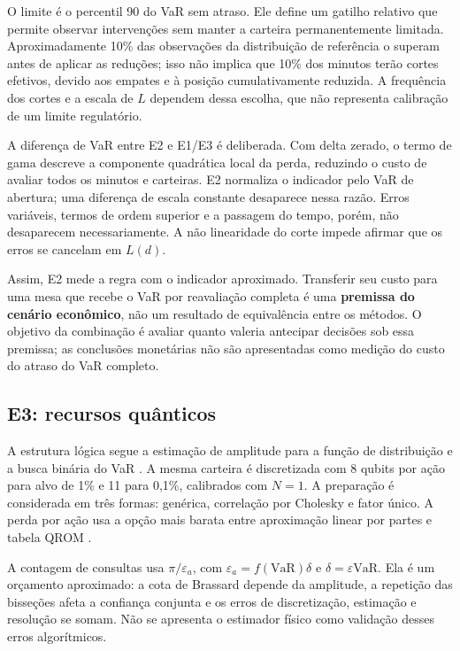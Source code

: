 \documentclass[conference,a4paper]{IEEEtran}
\begin{document}
O limite é o percentil 90 do VaR sem atraso. Ele define um gatilho relativo que permite observar intervenções sem manter a carteira permanentemente limitada. Aproximadamente 10\% das observações da distribuição de referência o superam antes de aplicar as reduções; isso não implica que 10\% dos minutos terão cortes efetivos, devido aos empates e à posição cumulativamente reduzida. A frequência dos cortes e a escala de \(L\) dependem dessa escolha, que não representa calibração de um limite regulatório.

A diferença de VaR entre E2 e E1/E3 é deliberada. Com delta zerado, o termo de gama descreve a componente quadrática local da perda, reduzindo o custo de avaliar todos os minutos e carteiras. E2 normaliza o indicador pelo VaR de abertura; uma diferença de escala constante desaparece nessa razão. Erros variáveis, termos de ordem superior e a passagem do tempo, porém, não desaparecem necessariamente. A não linearidade do corte impede afirmar que os erros se cancelam em \(L(d)\).

Assim, E2 mede a regra com o indicador aproximado. Transferir seu custo para uma mesa que recebe o VaR por reavaliação completa é uma \textbf{premissa do cenário econômico}, não um resultado de equivalência entre os métodos. O objetivo da combinação é avaliar quanto valeria antecipar decisões sob essa premissa; as conclusões monetárias não são apresentadas como medição do custo do atraso do VaR completo.

\subsection{E3: recursos quânticos}\label{e3-recursos-quuxe2nticos}

A estrutura lógica segue a estimação de amplitude para a função de distribuição e a busca binária do VaR \cite{woerner2019risk}. A mesma carteira é discretizada com 8 qubits por ação para alvo de 1\% e 11 para 0,1\%, calibrados com \(N=1\). A preparação é considerada em três formas: genérica, correlação por Cholesky e fator único. A perda por ação usa a opção mais barata entre aproximação linear por partes e tabela QROM \cite{babbush2018qrom}.

A contagem de consultas usa \(\pi/\varepsilon_a\), com \(\varepsilon_a=f(\mathrm{VaR})\delta\) e \(\delta=\varepsilon\mathrm{VaR}\). Ela é um orçamento aproximado: a cota de Brassard depende da amplitude, a repetição das bisseções afeta a confiança conjunta e os erros de discretização, estimação e resolução se somam. Não se apresenta o estimador físico como validação desses erros algorítmicos.
\end{document}
